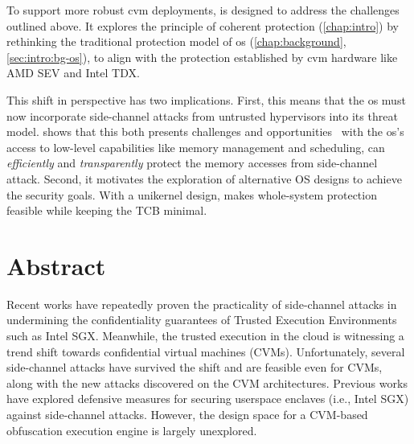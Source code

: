 
To support more robust \gls{cvm} deployments, \incognitos is designed to address the challenges outlined above.
It explores the principle of coherent protection (\cref{chap:intro}) by rethinking the traditional protection model of \gls{os} (\cref{chap:background}, \cref{sec:intro:bg-os}), to align with the protection established by \gls{cvm} hardware like AMD SEV and Intel TDX.

This shift in perspective has two implications.
First, this means that the \gls{os} must now incorporate side-channel attacks from untrusted hypervisors into its threat model.
\incognitos shows that this both presents challenges and opportunities \dash\ with the \gls{os}'s access to low-level capabilities like memory management and scheduling, \incognitos can \emph{efficiently} and \emph{transparently} protect the memory accesses from side-channel attack.
Second,  it motivates the exploration of alternative OS designs to achieve the security goals.
With a unikernel design, \incognitos makes whole-system protection feasible while keeping the TCB minimal.

\clearpage




\renewcommand{\thename}{\incognitos}

\renewcommand{\key}[1]{#1}
\section{Abstract}

Recent works have repeatedly proven the practicality of side-channel attacks in undermining the confidentiality guarantees of Trusted Execution Environments such as Intel SGX.
Meanwhile, the trusted execution in the cloud is witnessing a trend shift towards confidential virtual machines (CVMs).
Unfortunately, several side-channel attacks have survived the shift and are feasible even for CVMs, along with the new attacks discovered on the CVM architectures.
Previous works have explored defensive measures for securing userspace enclaves (i.e., Intel SGX) against side-channel attacks.
However, the design space for a CVM-based obfuscation execution engine is largely unexplored.

